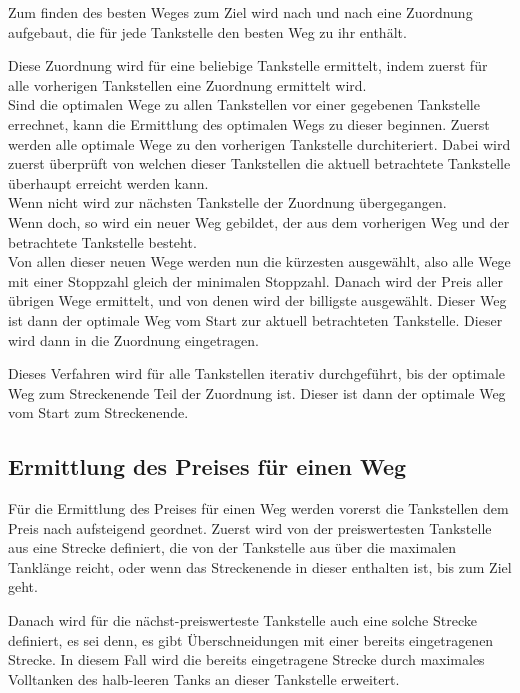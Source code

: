 \documentclass[a4paper,10pt,ngerman]{scrartcl}
\begin{document}
Zum finden des besten Weges zum Ziel wird nach und nach eine Zuordnung aufgebaut, die für jede Tankstelle den besten Weg zu ihr enthält.

Diese Zuordnung wird für eine beliebige Tankstelle ermittelt, indem zuerst für alle vorherigen Tankstellen eine Zuordnung ermittelt wird. \\
Sind die optimalen Wege zu allen Tankstellen vor einer gegebenen Tankstelle errechnet, kann die Ermittlung des optimalen Wegs zu dieser beginnen.
Zuerst werden alle optimale Wege zu den vorherigen Tankstelle durchiteriert. Dabei wird zuerst überprüft von welchen dieser Tankstellen die aktuell betrachtete Tankstelle überhaupt erreicht werden kann. \\
Wenn nicht wird zur nächsten Tankstelle der Zuordnung übergegangen. \\
Wenn doch, so wird ein neuer Weg gebildet, der aus dem vorherigen Weg und der betrachtete Tankstelle besteht. \\
Von allen dieser neuen Wege werden nun die kürzesten ausgewählt, also alle Wege mit einer Stoppzahl gleich der minimalen Stoppzahl. Danach wird der Preis aller übrigen Wege ermittelt, und von denen wird der billigste ausgewählt. Dieser Weg ist dann der optimale Weg vom Start zur aktuell betrachteten Tankstelle. Dieser wird dann in die Zuordnung eingetragen.

Dieses Verfahren wird für alle Tankstellen iterativ durchgeführt, bis der optimale Weg zum Streckenende Teil der Zuordnung ist. Dieser ist dann der optimale Weg vom Start zum Streckenende.

\subsection{Ermittlung des Preises für einen Weg}

Für die Ermittlung des Preises für einen Weg werden vorerst die Tankstellen dem Preis nach aufsteigend geordnet. Zuerst wird von der preiswertesten Tankstelle aus eine Strecke definiert, die von der Tankstelle aus über die maximalen Tanklänge reicht, oder wenn das Streckenende in dieser enthalten ist, bis zum Ziel geht.

Danach wird für die nächst-preiswerteste Tankstelle auch eine solche Strecke definiert, es sei denn, es gibt Überschneidungen mit einer bereits eingetragenen Strecke. In diesem Fall wird die bereits eingetragene Strecke durch maximales Volltanken des halb-leeren Tanks an dieser Tankstelle erweitert.
\end{document}

